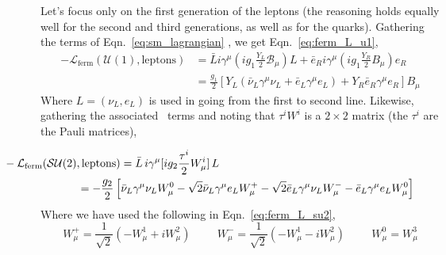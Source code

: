 Let's focus only on the first generation of the leptons (the reasoning holds equally well
for the second and third generations, as well as for the quarks). Gathering the
\Uone terms of Eqn.~\ref{eq:sm_lagrangian} , we get Eqn.~\ref{eq:ferm_L_u1},
\begin{align}
    -\mathcal{L}_{\text{ferm}}(\mathcal{U}(1), \text{leptons}) &= \bar{L} i \gamma^{\mu} (i g_1 \frac{Y_L}{2} \mathcal{B}_{\mu})L + \bar{e}_R i \gamma^{\mu} (i g_1 \frac{Y_R}{2} B_{\mu}) e_R \nonumber \\
    &= \frac{g_1}{2} [ Y_L ( \bar{\nu}_L \gamma^{\mu} \nu_L + \bar{e}_L \gamma^{\mu} e_L) + Y_R \bar{e}_R \gamma^{\mu} e_R ] B_{\mu}
    \label{eq:ferm_L_u1}
\end{align}
Where $L = (\nu_L, e_L)$ is used in going from the first to second line. 
Likewise, gathering the associated \SUtwo~terms and noting that $\tau^i W^i$ is a
$2\times2$ matrix (the $\tau^i$ are the Pauli matrices),

\begin{equation}
	\begin{multlined}
		\hspace{-2cm}-\mathcal{L}_{\text{ferm}}(\mathcal{SU}(2), \text{leptons}) =  \bar{L}\, i \gamma^{\mu} [i g_2 \frac{\tau^i}{2} W_{\mu}^i ] \,L \\
		= -\frac{g_2}{2} \left[ \bar{\nu}_L \gamma^{\mu} \nu_L W_{\mu}^0 - \sqrt{2}  \bar{\nu}_L \gamma^{\mu} e_L W_{\mu}^+ - \sqrt{2} \bar{e}_L \gamma^{\mu} \nu_L W_{\mu}^- - \bar{e}_L \gamma^{\mu} e_L W_{\mu}^0 \right]
	\end{multlined}
	\label{eq:ferm_L_su2}
\end{equation}
Where we have used the following in Eqn.~\ref{eq:ferm_L_su2},
\begin{equation}
	W_{\mu}^+ = \frac{1}{\sqrt{2}} \left( -W_{\mu}^1 + i W_{\mu}^2 \right) \hspace{1cm} W_{\mu}^- = \frac{1}{\sqrt{2}} \left( -W_{\mu}^1 - i W_{\mu}^2 \right) \hspace{1cm} W_{\mu}^0 = W_{\mu}^3
\end{equation}

